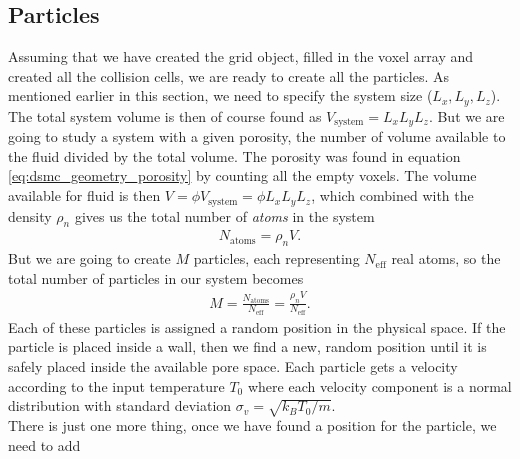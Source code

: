\subsection{Particles}
Assuming that we have created the grid object, filled in the voxel array and created all the collision cells, we are ready to create all the particles. As mentioned earlier in this section, we need to specify the system size ($L_x, L_y, L_z$). The total system volume is then of course found as $V_\text{system} = L_xL_yL_z$. But we are going to study a system with a given porosity, the number of volume available to the fluid divided by the total volume. The porosity was found in equation \eqref{eq:dsmc_geometry_porosity} by counting all the empty voxels. The volume available for fluid is then $V = \phi V_\text{system} = \phi L_xL_yL_z$, which combined with the density $\rho_n$ gives us the total number of \textit{atoms} in the system 
\begin{align}
	N_\text{atoms} = \rho_n V.
\end{align}
But we are going to create $M$ particles, each representing $N_\text{eff}$ real atoms, so the total number of particles in our system becomes
\begin{align}
	M = \frac{N_\text{atoms}}{N_\text{eff}} = \frac{\rho_n V}{N_\text{eff}}.
\end{align}
Each of these particles is assigned a random position in the physical space. If the particle is placed inside a wall, then we find a new, random position until it is safely placed inside the available pore space. Each particle gets a velocity according to the input temperature $T_0$ where each velocity component is a normal distribution with standard deviation $\sigma_v = \sqrt{k_BT_0/m}$.\\
There is just one more thing, once we have found a position for the particle, we need to add


